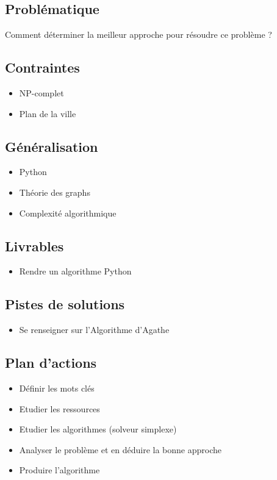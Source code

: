 \subsection*{Problématique}
{}
\noindent Comment déterminer la meilleur approche pour résoudre ce problème ?

\subsection*{Contraintes}
{}
\begin{itemize}
	\item NP-complet
	\item Plan de la ville
\end{itemize}

\subsection*{Généralisation}
{}
\begin{itemize}
	\item Python 
	\item Théorie des graphs 
	\item Complexité algorithmique  
\end{itemize}

\subsection*{Livrables}
{}
\begin{itemize}
	\item Rendre un algorithme Python
\end{itemize}

\subsection*{Pistes de solutions}
{}
\begin{itemize}
	\item Se renseigner sur l’Algorithme d’Agathe
\end{itemize}

\subsection*{Plan d'actions}
{}
\begin{itemize}
	\item Définir les mots clés 
	\item Etudier les ressources
	\item Etudier les algorithmes (solveur simplexe)
	\item Analyser le problème et en déduire la bonne approche
	\item Produire l’algorithme
\end{itemize}

